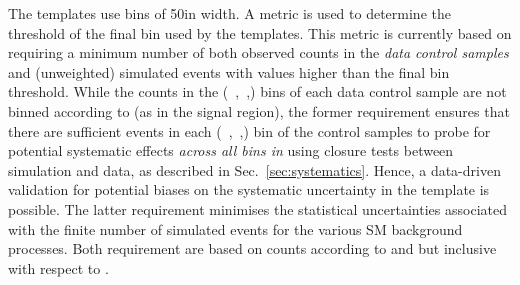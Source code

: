 The templates use \mht bins of 50\gev in width. A metric is used to determine the threshold of the final \mht bin used by the
templates. This metric is currently based on requiring a minimum number of both observed counts in the {\it data control samples} and
(unweighted) simulated events with \mht values higher than the final bin threshold. While the counts in the (\njet~,\nb~,\HT) bins of each
data control sample are not binned according to \mht (as in the signal region), the former requirement ensures that there are
sufficient events in each (\njet~,\nb~,\HT) bin of the control samples to probe for potential systematic effects {\it across all bins in
  \mht} using closure tests between simulation and data, as described in Sec.~\ref{sec:systematics}. Hence, a data-driven validation for
potential biases on the systematic uncertainty in the \mht template is possible. The latter requirement minimises the statistical
uncertainties associated with the finite number of simulated events for the various SM background processes. Both requirement are based on
counts according to \njet and \nb but inclusive with respect to \nb.
